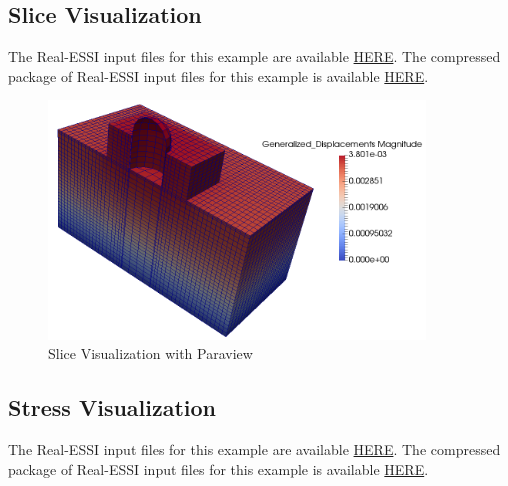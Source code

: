 \subsection{Slice Visualization}

The Real-ESSI input files for this example are available 
\href{http://cml01.engr.ucdavis.edu/shortCourse/Day1/Nuclear_Power_Plant_with_1D_motions_from_Deconvolution}{HERE}. 
The compressed package of Real-ESSI input files for this example is available 
\href{http://cml01.engr.ucdavis.edu/shortCourse/Day1/Nuclear_Power_Plant_with_1D_motions_from_Deconvolution/Nuclear_Power_Plant_with_1D_motions_from_Deconvolution.tgz}{HERE}.  

\begin{figure}[H]
  \centering
  \includegraphics[width = 10cm]{./Figure-files/Day1/Postprocess_examples_with_Paraview/slide_visualization.png}
  \caption{Slice Visualization with Paraview}
  \label{fig_paraview_slice}
\end{figure}


\clearpage
\newpage
\subsection{Stress Visualization}

The Real-ESSI input files for this example are available 
\href{http://cml01.engr.ucdavis.edu/shortCourse/Day1/Nuclear_Power_Plant_with_1D_motions_from_Deconvolution}{HERE}. 
The compressed package of Real-ESSI input files for this example is available 
\href{http://cml01.engr.ucdavis.edu/shortCourse/Day1/Nuclear_Power_Plant_with_1D_motions_from_Deconvolution/Nuclear_Power_Plant_with_1D_motions_from_Deconvolution.tgz}{HERE}.  


